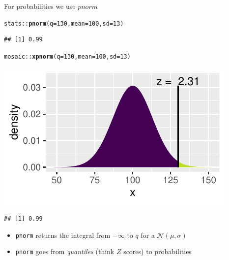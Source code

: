 \documentclass[10pt]{beamer}\usepackage[]{graphicx}\usepackage[]{color}
\makeatletter
\newcommand{\hlnum}[1]{\textcolor[rgb]{0.686,0.059,0.569}{#1}}%
\newcommand{\hlopt}[1]{\textcolor[rgb]{0,0,0}{#1}}%
\newcommand{\hlstd}[1]{\textcolor[rgb]{0.345,0.345,0.345}{#1}}%
\newcommand{\hlkwc}[1]{\textcolor[rgb]{0.333,0.667,0.333}{#1}}%
\newcommand{\hlkwd}[1]{\textcolor[rgb]{0.737,0.353,0.396}{\textbf{#1}}}%
\newenvironment{kframe}{%
 \def\at@end@of@kframe{}%
 \ifinner\ifhmode%
  \def\at@end@of@kframe{\end{minipage}}%
  \begin{minipage}{\columnwidth}%
 \fi\fi%
 \def\FrameCommand##1{\hskip\@totalleftmargin \hskip-\fboxsep
 \colorbox{shadecolor}{##1}\hskip-\fboxsep
     \hskip-\linewidth \hskip-\@totalleftmargin \hskip\columnwidth}%
 \MakeFramed {\advance\hsize-\width
   \@totalleftmargin\z@ \linewidth\hsize
   \@setminipage}}%
 {\par\unskip\endMakeFramed%
 \at@end@of@kframe}
\newenvironment{knitrout}{}{} %
\makeatother
\begin{document}
\begin{frame}[fragile]{For probabilities we use $pnorm$}
	
	
\begin{knitrout}\tiny
{}\color{fgcolor}\begin{kframe}
\begin{alltt}
\hlstd{stats}\hlopt{::}\hlkwd{pnorm}\hlstd{(}\hlkwc{q} \hlstd{=} \hlnum{130}\hlstd{,} \hlkwc{mean} \hlstd{=} \hlnum{100}\hlstd{,} \hlkwc{sd} \hlstd{=} \hlnum{13}\hlstd{)}
\end{alltt}
\begin{verbatim}
## [1] 0.99
\end{verbatim}
\end{kframe}
\end{knitrout}
	
	\pause 
	
\begin{knitrout}\tiny
{}\color{fgcolor}\begin{kframe}
\begin{alltt}
\hlstd{mosaic}\hlopt{::}\hlkwd{xpnorm}\hlstd{(}\hlkwc{q} \hlstd{=} \hlnum{130}\hlstd{,} \hlkwc{mean} \hlstd{=} \hlnum{100}\hlstd{,} \hlkwc{sd} \hlstd{=} \hlnum{13}\hlstd{)}
\end{alltt}
\end{kframe}

{\centering \includegraphics[width=0.6\linewidth]{figure/probs3-1} 

}


\begin{kframe}\begin{verbatim}
## [1] 0.99
\end{verbatim}
\end{kframe}
\end{knitrout}
	
	\pause 
	
	\begin{itemize}
		\item \texttt{pnorm} returns the integral from $-\infty$ to $q$ for a $\mathcal{N}(\mu, \sigma)$
		\item \texttt{pnorm} goes from \textit{quantiles} (think $Z$ scores) to probabilities
	\end{itemize}
	
\end{frame}
\end{document}
